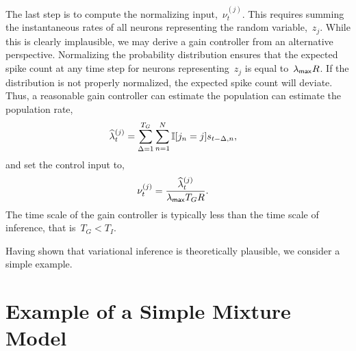 The last step is to compute the normalizing input,~$\nu_t^{(j)}$.
This requires summing the instantaneous rates of all neurons representing the
random variable,~$z_j$. While this is clearly implausible, we may derive
a gain controller from an alternative perspective. Normalizing the
probability distribution ensures that the expected spike count at
any time step for
neurons representing~$z_j$ is equal to~$\lambda_{\mathsf{max}} R$. If the distribution
is not properly normalized, the expected spike count will deviate.
Thus, a reasonable gain controller can estimate the population
can estimate the population rate,
\begin{align*}
\widehat{\lambda}_{t}^{(j)} &= \sum_{\Delta = 1}^{T_G} \sum_{n=1}^N \mathbb{I}[j_n=j] s_{t-\Delta, n},
\end{align*}
and set the control input to,
\begin{align*}
  \nu_{t}^{(j)} &= \frac{\widehat{\lambda}_{t}^{(j)}}{\lambda_{\mathsf{max}} T_G R}.
\end{align*}
The time scale of the gain controller is typically
less than the time scale of inference, that is~$T_G < T_I$.

Having shown that variational inference is theoretically plausible,
we consider a simple example.

\section{Example of a Simple Mixture Model}
\label{sec:mixture_example}

